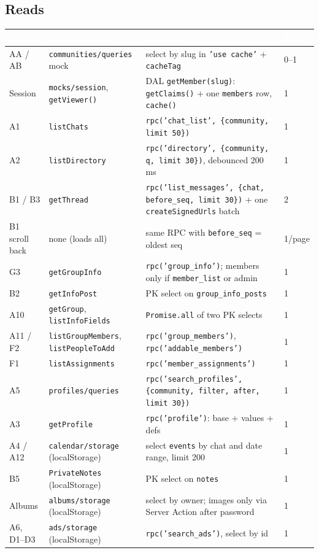 \documentclass[11pt,a4paper]{article}
\newcommand{\hdr}[1]{\textcolor{white}{\textbf{#1}}}
\newcommand{\code}[1]{\texttt{\small #1}}
\begin{document}
\subsection{Reads}
{\small
{}
\begin{longtable}{L{2.2cm} L{3.4cm} L{7.6cm} L{1.6cm}}
\hdr{Screen} & \hdr{Current source} & \hdr{Becomes} & \hdr{Trips}\\
\endhead
AA / AB & \code{communities/queries} mock & select by slug in \code{'use cache'} + \code{cacheTag} & 0--1\\
Session & \code{mocks/session}, \code{getViewer()} & DAL \code{getMember(slug)}: \code{getClaims()} + one \code{members} row, \code{cache()} & 1\\
A1 & \code{listChats} & \code{rpc('chat\_list', \{community, limit 50\})} & 1\\
A2 & \code{listDirectory} & \code{rpc('directory', \{community, q, limit 30\})}, debounced 200 ms & 1\\
B1 / B3 & \code{getThread} & \code{rpc('list\_messages', \{chat, before\_seq, limit 30\})} + one \code{createSignedUrls} batch & 2\\
B1 scroll back & none (loads all) & same RPC with \code{before\_seq} = oldest seq & 1/page\\
G3 & \code{getGroupInfo} & \code{rpc('group\_info')}; members only if \code{member\_list} or admin & 1\\
B2 & \code{getInfoPost} & PK select on \code{group\_info\_posts} & 1\\
A10 & \code{getGroup}, \code{listInfoFields} & \code{Promise.all} of two PK selects & 1\\
A11 / F2 & \code{listGroupMembers}, \code{listPeopleToAdd} & \code{rpc('group\_members')}, \code{rpc('addable\_members')} & 1\\
F1 & \code{listAssignments} & \code{rpc('member\_assignments')} & 1\\
A5 & \code{profiles/queries} & \code{rpc('search\_profiles', \{community, filter, after, limit 30\})} & 1\\
A3 & \code{getProfile} & \code{rpc('profile')}: base + values + defs & 1\\
A4 / A12 & \code{calendar/storage} (localStorage) & select \code{events} by chat and date range, limit 200 & 1\\
B5 & \code{PrivateNotes} (localStorage) & PK select on \code{notes} & 1\\
Albums & \code{albums/storage} (localStorage) & select by owner; images only via Server Action after password & 1\\
A6, D1--D3 & \code{ads/storage} (localStorage) & \code{rpc('search\_ads')}, select by id & 1\\
\end{longtable}
}
\end{document}
